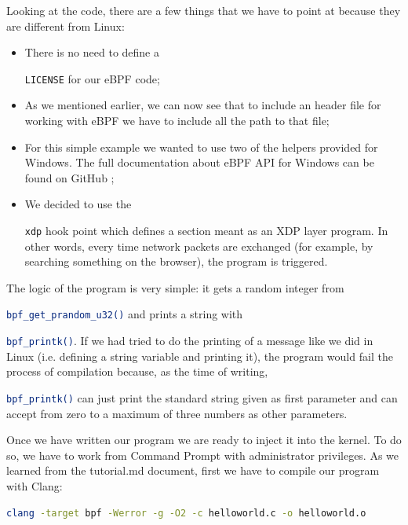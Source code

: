 Looking at the code, there are a few things that we have to point at because they are different from Linux:

\begin{itemize}
	\item 
		There is no need to define a \raggedright\colorbox{backcolour}{\lstinline[style=commandline, language=bash]|LICENSE|} for our eBPF code;
	\item 
		As we mentioned earlier, we can now see that to include an header file for working with eBPF we have to include all the path to that file;
	\item 
		For this simple example we wanted to use two of the helpers provided for Windows.
		The full documentation about eBPF API for Windows can be found on GitHub \cite{eBPFWinDoc};
	\item 
		We decided to use the \raggedright\colorbox{backcolour}{\lstinline[style=commandline, language=bash]|xdp|} hook point which defines a section meant as an XDP layer program.
		In other words, every time network packets are exchanged (for example, by searching something on the browser), the program is triggered.
\end{itemize}

The logic of the program is very simple: it gets a random integer from \raggedright\colorbox{backcolour}{\lstinline[style=commandline, language=bash]|bpf_get_prandom_u32()|} and prints a string with \raggedright\colorbox{backcolour}{\lstinline[style=commandline, language=bash]|bpf_printk()|}.
If we had tried to do the printing of a message like we did in Linux (i.e. defining a string variable and printing it), the program would fail the process of compilation because, as the time of writing, \raggedright\colorbox{backcolour}{\lstinline[style=commandline, language=bash]|bpf_printk()|} can just print the standard string given as first parameter and can accept from zero to a maximum of three numbers as other parameters.

Once we have written our program we are ready to inject it into the kernel.
To do so, we have to work from Command Prompt with administrator privileges.
As we learned from the tutorial.md document, first we have to compile our program with Clang:

\begin{lstlisting}[style=commandline, language=bash, caption={``Hello world!''-like program compilation command in ebpf-for-windows.}]
	clang -target bpf -Werror -g -O2 -c helloworld.c -o helloworld.o
\end{lstlisting}

